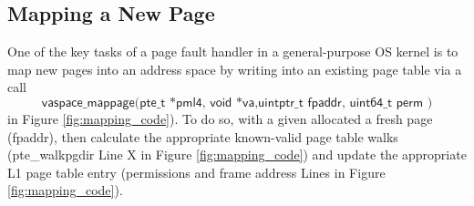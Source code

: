 \subsection{Mapping a New Page}
One of the key tasks of a page fault handler in a general-purpose OS kernel is
to map new pages into an address space by writing into an existing page table via a call
\[\textsf{vaspace\_mappage(pte\_t *pml4, void *va,uintptr\_t fpaddr, uint64\_t perm )}\] in Figure \ref{fig:mapping_code}).
To do so, with a given allocated a fresh page (\textsf{fpaddr}), then calculate the appropriate
known-valid page table walks (\textsf{pte\_walkpgdir} Line X in Figure \ref{fig:mapping_code})  and update the appropriate L1 page table entry (permissions and frame address Lines in Figure \ref{fig:mapping_code}).
